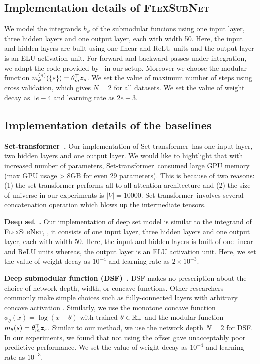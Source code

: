 \documentclass{article}
\newcommand{\our}{\textsc{Flex\-Sub\-Net}}
\newcommand{\xhdr}[1]{\noindent\textbf{#1.}}
\renewcommand{\cite}{\citep}
\newcommand{\settx}{Set-transformer}
\begin{document}
\subsection{Implementation details of \our}

We model the integrands $h_{\theta}$ of the submodular funcions using one input layer, three hidden layers and one output layer, each with width 50. Here, the input and hidden layers are built using one
linear and ReLU units and the output layer is an ELU activation unit. For forward and backward passes under integration, we adapt the code provided by~\citet{umnn}
in our setup. Moreover we choose the modular function $m_{\theta} ^{(n)}(\left\{ s\right\}) = \theta_m ^\top \bm{z}_s$.
We set the value of maximum number of steps using cross validation, which gives $N=2$ for all datasets. 
We set the value of weight decay as $1e-4$ and learning rate as $2e-3$.

\subsection{Implementation details of the baselines}

\xhdr{\settx~\cite{lee2019set}} Our implementation of \settx\ has one input layer, two hidden layers and one output layer. We would like to hightlight that with increased number of parameters, \settx\ consumed large GPU memory (max GPU usage > 8GB for even 29 parameters). This is because of two reasons: (1) the set transformer performs all-to-all attention architecture and (2) the size of universe in our experiments is $|V|=10000$. \settx\ involves several concatenation operation which blows up the intermediate tensors.  

\xhdr{Deep set~\cite{zaheer2017deep}} Our implementation of deep set model is  similar to the integrand of \our, \ie, it consists of one input layer, three hidden layers and one output layer, each with width 50. Here, the input and hidden layers is built of one linear and ReLU units whereas, the output layer is an ELU activation unit. Here, we set the value of weight decay as $10^{-4}$ and learning rate as $2{\times}10^{-3}$.  

\xhdr{Deep submodular function (DSF)~\cite{bilmes2017deep}}
DSF makes no prescription about the choice of network depth, width, or concave functions.
Other researchers commonly make simple choices such as fully-connected layers with arbitrary concave activation \citep{pmlr-v151-manupriya22a}.  Similarly, we use the monotone concave function $\phi_{\theta}(x) = \log(x +\theta)$  with trained $\theta\in\mathbb{R}_+$ and the modular function $m_{\theta}(s) = \theta_m^\top \bm{z}_s$. 
Similar to our method, we use the network depth $N=2$ for DSF.
In our experiments, we found that not using the offset gave unacceptably poor predictive performance. We set the value of weight decay as $10^{-4}$ and learning rate as $10^{-3}$.  
\end{document}
